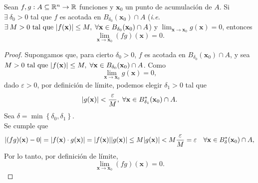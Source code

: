 \begin{propertie} \label{prop:cero_x_acotada}
 Sean $f, g : A  \subseteq  \mathbb{R}^n \to \mathbb{R}$ funciones y $\mathbf{x}_0$ un punto de acumulaci\'on de $A$. Si $\exists\: \delta_0 > 0$ tal que $f$ es acotada en $B_{\delta_0}(\mathbf{x}_0) \cap A$ (\textit{i.e.} $\exists\: M > 0 \text{ tal que } \abs{f(\mathbf{x})} \le M,\;\forall \mathbf{x} \in  B_{\delta_0}(\mathbf{x}_0) \cap A$) y $\lim_{\mathbf{x} \to \mathbf{x}_0}g(\mathbf{x}) = 0$, entonces
\[
 \lim_{\mathbf{x} \to \mathbf{x}_0}(f  g)(\mathbf{x}) = 0.
\]
\begin{proof} Supongamos que, para cierto $\delta_0 > 0$, $f$ es acotada en $B_{\delta_0}(\mathbf{x}_0) \cap A$, y sea $M > 0 \text{ tal que } \abs{f(\mathbf{x})} \le M, \; \forall \mathbf{x} \in  B_{\delta_0}(\mathbf{x}_0) \cap A$.
Como 
\[
\lim_{\mathbf{x} \to \mathbf{x}_0}g(\mathbf{x}) = 0, 
\]
dado $\varepsilon > 0 $, por definici\'on de l\'imite, podemos elegir $\delta_1 > 0$ tal que 
\[
 \abs{g(\mathbf{x})} < \frac{\varepsilon}{M},\;\forall \mathbf{x} \in  B^*_{\delta_1}(\mathbf{x}_0) \cap A.                                                                                               
\]
Sea $\delta = \min{ \left\{ \delta_0, \delta_1 \right\} }$. \\
Se cumple que
\[
 \abs{ (fg)(\mathbf{x}) - 0 } = \abs{ f(\mathbf{x}) \cdot g(\mathbf{x}) } = \abs{f(\mathbf{x})}\abs{g(\mathbf{x})} \le 
 M \abs{g(\mathbf{x})} < M \frac{\varepsilon}{M} = \varepsilon \quad \forall \mathbf{x} \in  B^*_{\delta}(\mathbf{x}_0) \cap A,
\]
Por lo tanto, por definici\'on de l\'imite,
\[
 \lim_{\mathbf{x} \to \mathbf{x}_0}(fg)(\mathbf{x}) = 0.
\]\end{proof}
\end{propertie}


